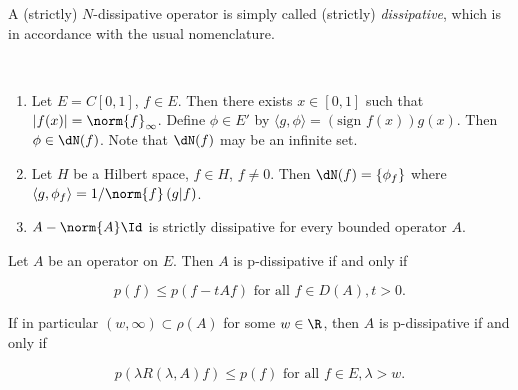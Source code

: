 A (strictly) $N$-dissipative operator is simply called (strictly) \emph{dissipative}, which is in accordance with the usual nomenclature.
\begin{examples}\label{ex:a2-2.2}  ~ 
\begin{enumerate}[\upshape(i), wide, labelindent=.25em]

\item \label{ex:a2-2.2.1}
Let $E = C[0,1]$, $f \in E$.
Then there exists $x \in [0,1]$ such that $|f(x)| = \norm{f}_{\infty}$.
Define $\phi \in E'$ by $\langle g,\phi \rangle = (\text{sign } f(x))g(x)$.
Then $\phi \in \dN(f)$.
Note that $\dN(f)$ may be an infinite set.
\item \label{ex:a2-2.2.2}
Let $H$ be a Hilbert space, $f \in H$, $f \neq 0$.
Then  $\dN(f) = \{\phi_{f}\}$ where \\
$\langle g,\phi_{f} \rangle = 1/\norm{f}\,(g|f)$.
\item \label{ex:a2-2.2.3}
$A - \norm{A}\Id$ is strictly dissipative for every bounded operator $A$.
\end{enumerate}
\end{examples}
\begin{proposition}\label{prop:a2-2.3}
Let $A$ be an operator on $E$.
Then $A$ is p-dissipative if and only if

\begin{equation} \label{eq:a2-2.7}
p(f) \leq p(f - tAf) \text{ for all } f \in D(A), t > 0.
\end{equation}

If in particular $(w,\infty) \subset \rho(A)$ for some $w \in \R$, then $A$ is p-dissipative if and only if

\begin{equation}\label{eq:a2-2.8}
p(\lambda R(\lambda,A)f) \leq p(f) \text{ for all } f \in E, \lambda > w.
\end{equation}
\end{proposition}

